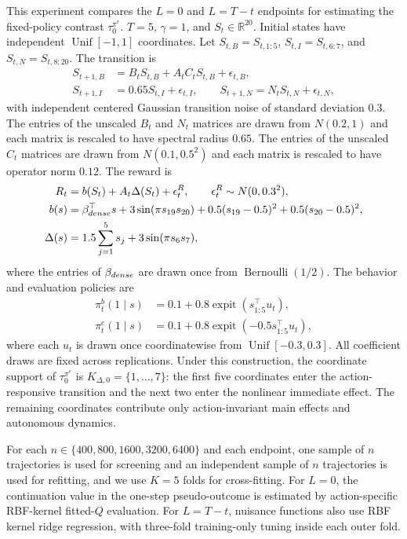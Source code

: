 \documentclass[opre,nonblindrev]{informs4}
\newenvironment{revision}{\begingroup\color{revisionblue}\ignorespaces}{\endgroup}
\newcommand{\blipadv}{\tau}
\begin{document}
\begin{revision}
This experiment compares the $L=0$ and $L=T-t$ endpoints for estimating the
fixed-policy contrast $\blipadv_0^{\pi^e}$. $T=5$, $\gamma=1$, and $S_t\in\mathbb R^{20}$. Initial
states have independent $\operatorname{Unif}[-1,1]$ coordinates. Let
$S_{t,B}=S_{t,1:5}$, $S_{t,I}=S_{t,6:7}$, and
$S_{t,N}=S_{t,8:20}$. The transition is
\begin{align}S_{t+1,B}&=B_tS_{t,B}+A_tC_tS_{t,B}+\epsilon_{t,B},\nonumber\\
 S_{t+1,I}&=0.65S_{t,I}+\epsilon_{t,I},\qquad
 S_{t+1,N}=N_tS_{t,N}+\epsilon_{t,N},
 \label{eq:nonlinear-krr-transition}
\end{align}
with independent centered Gaussian transition noise of standard deviation
$0.3$. The entries of the unscaled $B_t$ and $N_t$ matrices are drawn from
$N(0.2,1)$ and each matrix is rescaled to have spectral radius $0.65$. The
entries of the unscaled $C_t$ matrices are drawn from $N(0.1,0.5^2)$ and each
matrix is rescaled to have operator norm $0.12$. The reward is
\begin{align}
 R_t={}&b(S_t)+A_t\Delta(S_t)+\epsilon^R_t,\qquad
 \epsilon^R_t\sim N(0,0.3^2),\nonumber\\
 b(s)={}&\beta_{\rm dense}^\top s
 +3\sin(\pi s_{19}s_{20})
 +0.5(s_{19}-0.5)^2+0.5(s_{20}-0.5)^2,\nonumber\\
 \Delta(s)={}&1.5\sum_{j=1}^5s_j+3\sin(\pi s_6s_7),
 \label{eq:nonlinear-krr-reward}
\end{align}
where the entries of $\beta_{\rm dense}$ are drawn once from
$\operatorname{Bernoulli}(1/2)$. The behavior and evaluation policies are
\begin{align*}
 \pi_t^b(1\mid s)&=0.1+0.8\operatorname{expit}(s_{1:5}^\top u_t),\\
 \pi_t^e(1\mid s)&=0.1+0.8\operatorname{expit}(-0.5s_{1:5}^\top u_t),
\end{align*}
where each $u_t$ is drawn once coordinatewise from
$\operatorname{Unif}[-0.3,0.3]$. All coefficient draws are fixed across
replications. Under this construction, the coordinate support of
$\blipadv_0^{\pi^e}$ is
$K_{\Delta,0}=\{1,\ldots,7\}$: the first five coordinates enter the
action-responsive transition and the next two enter the nonlinear immediate
effect. The remaining coordinates contribute only action-invariant main
effects and autonomous dynamics.

For each $n\in\{400,800,1600,3200,6400\}$ and each endpoint, one sample of
$n$ trajectories is used for screening and an independent sample of $n$
trajectories is used for refitting, and we use $K=5$ folds for cross-fitting. For $L=0$, the continuation value in the
one-step pseudo-outcome is estimated by action-specific RBF-kernel fitted-$Q$
evaluation. For $L=T-t$, nuisance functions also use RBF kernel ridge regression, with
three-fold training-only tuning inside each outer fold.


\end{revision}
\end{document}
